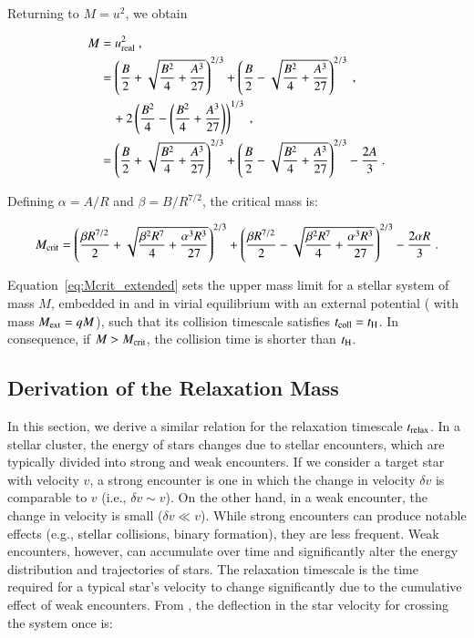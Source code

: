 \begin{appendixs}
	Returning to $M = u^2$, we obtain
	
	\begin{align}
		M &= u_{\rm real}^2 ~,\\ 
		&= \left(\frac{B}{2}+\sqrt{\frac{B^2}{4} + \frac{A^3}{27}}\right)^{2/3} + \left(\frac{B}{2}-\sqrt{\frac{B^2}{4} + \frac{A^3}{27}}\right)^{2/3} ~,\\
		&\quad + 2\left( \frac{B^2}{4} - \left(\frac{B^2}{4} + \frac{A^3}{27}\right) \right)^{1/3}~,\\
		&= \left(\frac{B}{2}+\sqrt{\frac{B^2}{4} + \frac{A^3}{27}}\right)^{2/3} + \left(\frac{B}{2}-\sqrt{\frac{B^2}{4} + \frac{A^3}{27}}\right)^{2/3} - \frac{2A}{3}~.
	\end{align}
	
	Defining $\alpha = A/R$ and $\beta = B/R^{7/2}$, the critical mass is:
	
	\begin{equation}
		M_{\rm crit} = \left(\frac{\beta R^{7/2}}{2}+\sqrt{\frac{\beta^2 R^7}{4} + \frac{\alpha^3 R^3}{27}}\right)^{2/3} + \left(\frac{\beta R^{7/2}}{2}-\sqrt{\frac{\beta^2 R^7}{4} + \frac{\alpha^3 R^3}{27}}\right)^{2/3} - \frac{2\alpha R}{3}~.
		\label{eq:Mcrit_extended}
	\end{equation}
	
	Equation~\eqref{eq:Mcrit_extended} sets the upper mass limit for a stellar system of mass $M$, embedded in and in virial equilibrium with an external potential ( with mass $M_{\rm ext} = q M$), such that its collision timescale satisfies $t_{\rm coll} = t_{\rm H}$. In consequence, if $M > M_{\rm crit}$, the collision time is shorter than $t_{\rm H}$.
	
	\subsection{Derivation of the Relaxation Mass}
	\label{sec:app_Mrelax}
	
	In this section, we derive a similar relation for the relaxation timescale $t_{\rm relax}$. In a stellar cluster, the energy of stars changes due to stellar encounters, which are typically divided into strong and weak encounters. If we consider a target star with velocity $v$, a strong encounter is one in which the change in velocity $\delta v$ is comparable to $v$ (i.e., $\delta v \sim v$). On the other hand, in a weak encounter, the change in velocity is small ($\delta v \ll v$). While strong encounters can produce notable effects (e.g., stellar collisions, binary formation), they are less frequent. Weak encounters, however, can accumulate over time and significantly alter the energy distribution and trajectories of stars. The relaxation timescale is the time required for a typical star's velocity to change significantly due to the cumulative effect of weak encounters. From \citet{2008gady.book.....B}, the deflection in the star velocity for crossing the system once is:
	

\end{appendixs}
